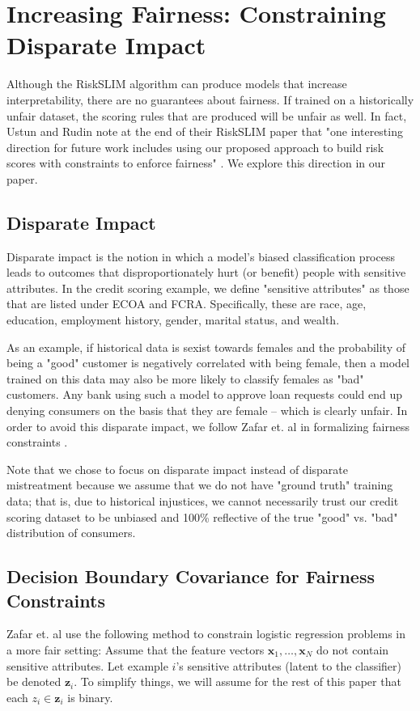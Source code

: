 \documentclass[11pt, margin=1in]{article}
\newcommand{\vect}[1]{\boldsymbol{#1}}
\begin{document}
\section{Increasing Fairness: Constraining Disparate Impact}

Although the RiskSLIM algorithm can produce models that increase interpretability, there are no guarantees about fairness.  If trained on a historically unfair dataset, the scoring rules that are produced will be unfair as well.  In fact, Ustun and Rudin note at the end of their RiskSLIM paper that "one interesting direction for future work includes using our proposed approach to build risk scores with constraints to enforce fairness" \cite{risk-slim}.  We explore this direction in our paper.  

\subsection{Disparate Impact}
Disparate impact is the notion in which a model's biased classification process leads to outcomes that disproportionately hurt (or benefit) people with sensitive attributes.  In the credit scoring example, we define "sensitive attributes" as those that are listed under ECOA and FCRA.  Specifically, these are race, age, education, employment history, gender, marital status, and wealth.  

As an example, if historical data is sexist towards females and the probability of being a "good" customer is negatively correlated with being female, then a model trained on this data may also be more likely to classify females as "bad" customers.  Any bank using such a model to approve loan requests could end up denying consumers on the basis that they are female -- which is clearly unfair.  In order to avoid this disparate impact, we follow Zafar et. al in formalizing fairness constraints \cite{disparate-impact}.  

Note that we chose to focus on disparate impact instead of disparate mistreatment \cite{disparate-mistreatment} because we assume that we do not have "ground truth" training data; that is, due to historical injustices, we cannot necessarily trust our credit scoring dataset to be unbiased and 100\% reflective of the true "good" vs. "bad" distribution of consumers.   

\subsection{Decision Boundary Covariance for Fairness Constraints}    
Zafar et. al \cite{disparate-impact} use the following method to constrain logistic regression problems in a more fair setting:  Assume that the feature vectors $\vect{x}_1, \ldots, \vect{x}_N$ do not contain sensitive attributes.  Let example $i$'s sensitive attributes (latent to the classifier) be denoted $\vect{z}_i$.  To simplify things, we will assume for the rest of this paper that each $z_i \in \vect{z}_i$ is binary.  
\end{document}
